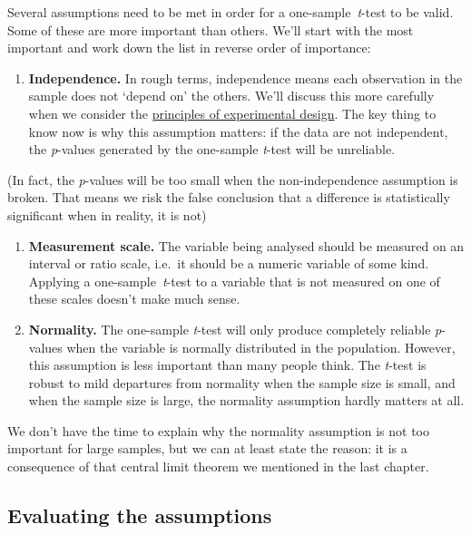 \documentclass[
]{book}
\providecommand{\tightlist}{%
  \setlength{\itemsep}{0pt}\setlength{\parskip}{0pt}}
\begin{document}
Several assumptions need to be met in order for a one-sample~\emph{t}-test to be valid. Some of these are more important than others. We'll start with the most important and work down the list in reverse order of importance:

\begin{enumerate}
\def\labelenumi{\arabic{enumi}.}
\tightlist
\item
  \textbf{Independence.} In rough terms, independence means each observation in the sample does not `depend on' the others. We'll discuss this more carefully when we consider the \protect\hyperlink{experimental-design}{principles of experimental design}. The key thing to know now is why this assumption matters: if the data are not independent, the \emph{p}-values generated by the one-sample \emph{t}-test will be unreliable.
\end{enumerate}

(In fact, the \emph{p}-values will be too small when the non-independence assumption is broken. That means we risk the false conclusion that a difference is statistically significant when in reality, it is not)

\begin{enumerate}
\def\labelenumi{\arabic{enumi}.}
\setcounter{enumi}{1}
\item
  \textbf{Measurement scale.} The variable being analysed should be measured on an interval or ratio scale, i.e.~it should be a numeric variable of some kind. Applying a one-sample~\emph{t}-test to a variable that is not measured on one of these scales doesn't make much sense.
\item
  \textbf{Normality.} The one-sample \emph{t}-test will only produce completely reliable \emph{p}-values when the variable is normally distributed in the population. However, this assumption is less important than many people think. The \emph{t}-test is robust to mild departures from normality when the sample size is small, and when the sample size is large, the normality assumption hardly matters at all.
\end{enumerate}

We don't have the time to explain why the normality assumption is not too important for large samples, but we can at least state the reason: it is a consequence of that central limit theorem we mentioned in the last chapter.

\hypertarget{evaluating-the-assumptions}{%
\subsection{Evaluating the assumptions}\label{evaluating-the-assumptions}}
\end{document}
